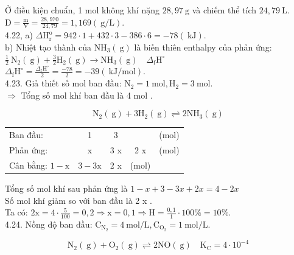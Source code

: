 \documentclass[10pt]{article}
\begin{document}
Ở điều kiện chuẩn, 1 mol không khí nặng $28,97 \mathrm{~g}$ và chiếm thể tích $24,79 \mathrm{~L}$.\\
$\mathrm{D}=\frac{\mathrm{m}}{\mathrm{V}}=\frac{28,970}{24,79}=1,169(\mathrm{~g} / \mathrm{L})$.\\
4.22, a) $\Delta \mathrm{H}_{\mathrm{r}}^{\mathrm{o}}=942 \cdot 1+432 \cdot 3-386 \cdot 6=-78(\mathrm{~kJ})$.\\
b) Nhiệt tạo thành của $\mathrm{NH}_{3}(\mathrm{~g})$ là biến thiên enthalpy của phản ứng:\\
$\frac{1}{2} \mathrm{~N}_{2}(\mathrm{~g})+\frac{3}{2} \mathrm{H}_{2}(\mathrm{~g}) \longrightarrow \mathrm{NH}_{3}(\mathrm{~g}) \quad \Delta_{\mathrm{f}} \mathrm{H}^{\circ}$\\
$\Delta_{\mathrm{f}} \mathrm{H}^{\circ}=\frac{\Delta_{\mathrm{r}} \mathrm{H}^{\circ}}{2}=\frac{-78}{2}=-39(\mathrm{~kJ} / \mathrm{mol})$.\\
4.23. Giả thiết số mol ban đầu: $\mathrm{N}_{2}=1 \mathrm{~mol}, \mathrm{H}_{2}=3 \mathrm{~mol}$.\\
$\Rightarrow$ Tổng số mol khí ban đầu là 4 mol .

$$
\mathrm{N}_{2}(\mathrm{~g})+3 \mathrm{H}_{2}(\mathrm{~g}) \rightleftharpoons 2 \mathrm{NH}_{3}(\mathrm{~g})
$$

\begin{center}
\begin{tabular}{lcccc}
Ban đầu: & 1 & 3 &  & (mol) \\
Phản ứng: & x & 3 x & 2 x & (mol) \\
Cân bằng: $1-\mathrm{x}$ & $3-3 \mathrm{x}$ & 2 x & (mol) &  \\
\end{tabular}
\end{center}

Tổng số mol khí sau phản ứng là $1-x+3-3 x+2 x=4-2 x$\\
Số mol khí giảm so với ban đầu là 2 x .\\
Ta có: $2 \mathrm{x}=4 \cdot \frac{5}{100}=0,2 \Rightarrow \mathrm{x}=0,1 \Rightarrow \mathrm{H}=\frac{0,1}{1} \cdot 100 \%=10 \%$.\\
4.24. Nồng độ ban đầu: $\mathrm{C}_{\mathrm{N}_{2}}=4 \mathrm{~mol} / \mathrm{L}, \mathrm{C}_{\mathrm{O}_{2}}=1 \mathrm{~mol} / \mathrm{L}$.

$$
\mathrm{N}_{2}(\mathrm{~g})+\mathrm{O}_{2}(\mathrm{~g}) \rightleftharpoons 2 \mathrm{NO}(\mathrm{~g}) \quad \mathrm{K}_{\mathrm{C}}=4 \cdot 10^{-4}
$$
\end{document}
